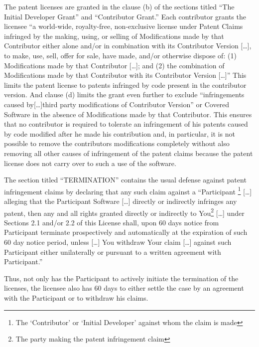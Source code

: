 The patent licenses are granted in the clause (b) of the sections titled
\enquote{The Initial Developer Grant} and \enquote{Contributor
  Grant.} Each contributor grants the licensee \enquote{a
  world-wide, royalty-free, non-exclusive license under Patent Claims infringed
  by the making, using, or selling of Modifications made by that Contributor
  either alone and/or in combination with its Contributor Version [\ldots], to
  make, use, sell, offer for sale, have made, and/or otherwise dispose of: (1)
  Modifications made by that Contributor [\ldots]; and (2) the combination of
  Modifications made by that Contributor with its Contributor Version [\ldots]} 
This limits the patent license to patents infringed by code present in the
contributor version. And clause (d) limits the grant even further to exclude
\enquote{infringements caused by[\ldots]third party modifications of Contributor
Version} or {Covered Software in the absence of Modifications
made by that Contributor.}
This ensures that no contributor is required to tolerate an infringement of his
patents caused by code modified after he made his contribution and, in
particular, it is not possible to remove the contributors modifications completely
without also removing all other causes of infringement of the patent claims
because the patent license does not carry over to such a use of the software.

The section titled \enquote{TERMINATION} contains the usual defense
against patent infringement claims by declaring that any such claim
against a \enquote{Participant%
  \footnote{The \enquote{Contributor} or \enquote{Initial Developer} against
  whom the claim is made}
[\ldots] alleging that the Participant Software [\ldots] directly or indirectly
infringes any patent, then any and all rights granted directly or indirectly to 
You\footnote{The party making the patent infringement claim}
[\ldots] under Sections 2.1 and/or 2.2 of this
License shall, upon 60 days notice from Participant terminate prospectively and
automatically at the expiration of such 60 day notice period, unless [\ldots] 
You withdraw Your claim [\ldots] against such Participant either unilaterally or
pursuant to a written agreement with Participant.}

Thus, not only has the Participant to actively initiate the termination of the
licenses, the licensee also has 60 days to either settle the case by an
agreement with the Participant or to withdraw his claims.



